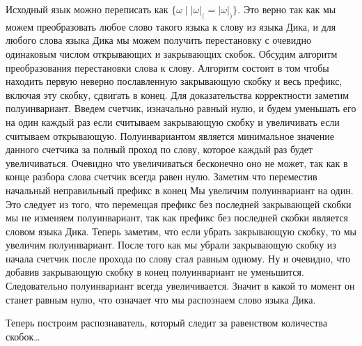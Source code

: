 \documentclass[a4paper, 14pt]{extarticle}
\begin{document}
Исходный язык можно переписать как $\{ \omega \mid |\omega|_( = |\omega|_)\}$.
Это верно так как мы можем преобразовать любое слово такого языка к слову из языка Дика, и
для любого слова языка Дика мы можем получить перестановку с очевидно одинаковым числом 
открывающих и закрывающих скобок. Обсудим алгоритм преобразования перестановки слова к слову.
Алгоритм состоит в том чтобы находить первую неверно пославленную закрывающую скобку и весь
префикс, включая эту скобку, сдвигать в конец. Для доказательства корректности заметим
полуинвариант. Введем счетчик, изначально равный нулю, и будем уменьшать его на один каждый
раз если считываем закрывающую скобку и увеличивать если считываем открывающую. Полуинвариантом
является минимальное значение данного счетчика за полный проход по слову, которое каждый раз
будет увеличиваться. Очевидно что увеличиваться бесконечно оно не может, так как в конце разбора
слова счетчик всегда равен нулю. Заметим что переместив начальный неправильный префикс в конец
Мы увеличим полуинвариант на один. Это следует из того, что перемещая префикс без последней
закрывающей скобки мы не изменяем полуинвариант, так как префикс без последней скобки является
словом языка Дика. Теперь заметим, что если убрать закрывающую скобку, то мы увеличим
полуинвариант. После того как мы убрали закрывающую скобку из начала счетчик после прохода по
слову стал равным одному. Ну и очевидно, что добавив закрывающую скобку в конец полуинвариант
не уменьшится. Следовательно полуинвариант всегда увеличивается. Значит в какой то момент он
станет равным нулю, что означает что мы распознаем слово языка Дика. 

Теперь построим распознаватель, который следит за равенством количества скобок\dots
\end{document}
